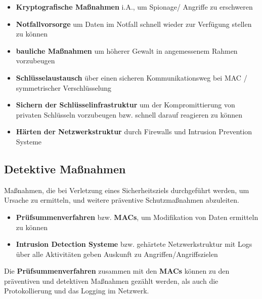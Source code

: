\begin{itemize}
    \itemsep0.5em
    \item \textbf{Kryptografische Maßnahmen} i.A., um Spionage/ Angriffe zu erschweren
    \item \textbf{Notfallvorsorge} um Daten im Notfall schnell wieder zur Verfügung stellen zu können
    \item \textbf{bauliche Maßnahmen} um höherer Gewalt in angemessenem Rahmen vorzubeugen
    \item \textbf{Schlüsselaustausch} über einen sicheren Kommunikationsweg bei MAC / symmetrischer Verschlüsselung
    \item \textbf{Sichern der Schlüsselinfrastruktur} um der Kompromittierung von privaten Schlüsseln vorzubeugen bzw. schnell darauf reagieren zu können
    \item \textbf{Härten der Netzwerkstruktur} durch Firewalls und Intrusion Prevention Systeme
\end{itemize}

\subsection*{Detektive Maßnahmen}

Maßnahmen, die bei Verletzung eines Sicherheitsziels durchgeführt werden, um Ursache zu ermitteln, und weitere präventive Schutzmaßnahmen abzuleiten.

\begin{itemize}
    \item \textbf{Prüfsummenverfahren} bzw. \textbf{MACs}, um Modifikation von Daten ermitteln zu können
    \item \textbf{Intrusion Detection Systeme} bzw. gehärtete Netzwerkstruktur mit Logs über alle Aktivitäten geben Auskunft zu Angriffen/Angriffszielen
\end{itemize}

\noindent
Die \textbf{Prüfsummenverfahren} zusammen mit den \textbf{MACs} können zu den präventiven und detektiven Maßnahmen gezählt werden, als auch die Protokollierung und das Logging im Netzwerk.